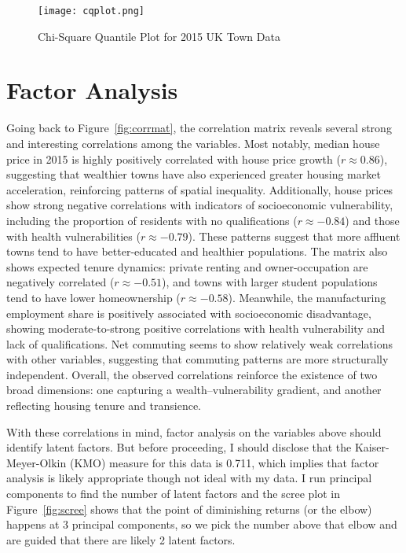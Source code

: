\documentclass[12pt]{article}
\begin{document}
\begin{figure}
    \centering
    \texttt{[image: cqplot.png]}
    \caption{Chi-Square Quantile Plot for 2015 UK Town Data}
    \label{fig:cqplot}
\end{figure}

\section{Factor Analysis}
Going back to Figure~\ref{fig:corrmat}, the correlation matrix reveals several strong and interesting correlations among the variables. Most notably, median house price in 2015 is highly positively correlated with house price growth (\(r \approx 0.86\)), suggesting that wealthier towns have also experienced greater housing market acceleration, reinforcing patterns of spatial inequality. Additionally, house prices show strong negative correlations with indicators of socioeconomic vulnerability, including the proportion of residents with no qualifications (\(r \approx -0.84\)) and those with health vulnerabilities (\(r \approx -0.79\)). These patterns suggest that more affluent towns tend to have better-educated and healthier populations. The matrix also shows expected tenure dynamics: private renting and owner-occupation are negatively correlated (\(r \approx -0.51\)), and towns with larger student populations tend to have lower homeownership (\(r \approx -0.58\)). Meanwhile, the manufacturing employment share is positively associated with socioeconomic disadvantage, showing moderate-to-strong positive correlations with health vulnerability and lack of qualifications. Net commuting seems to show relatively weak correlations with other variables, suggesting that commuting patterns are more structurally independent. Overall, the observed correlations reinforce the existence of two broad dimensions: one capturing a wealth--vulnerability gradient, and another reflecting housing tenure and transience.

With these correlations in mind, factor analysis on the variables above should identify latent factors. But before proceeding, I should disclose that the Kaiser-Meyer-Olkin (KMO) measure for this data is 0.711, which implies that factor analysis is likely appropriate though not ideal with my data. I run principal components to find the number of latent factors and the scree plot in Figure~\ref{fig:scree} shows that the point of diminishing returns (or the elbow) happens at 3 principal components, so we pick the number above that elbow and are guided that there are likely 2 latent factors.
\end{document}
